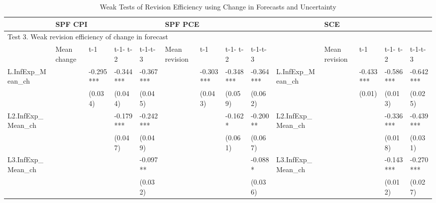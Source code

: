 \documentclass[]{article}
\begin{document}
	
	\begin{table}
		\begin{adjustbox}{width={24cm},totalheight={14cm}}
			\begin{threeparttable}
				\caption{Weak Tests of Revision Efficiency using Change in Forecasts and Uncertainty}
				\label{WeakRevEfficiency}
				\begin{tabular}{llllllllllllll}
					\hline 
					& \multicolumn{4}{l}{SPF CPI}                     & \multicolumn{4}{l}{SPF PCE}                       &                      & \multicolumn{4}{l}{SCE}                           \\
					\hline 
					\multicolumn{14}{l}{Test 3. Weak revision efficiency of change in forecast}                                                                                                                                    \\
					\hline 
					& Mean change & t-1       & t-1- t-2  & t-1-t-3   & Mean revision & t-1       & t-1- t-2  & t-1-t-3   &                      & Mean revision & t-1       & t-1- t-2  & t-1-t-3   \\
					\hline 
					L.InfExp\_Mean\_ch   &             & -0.295*** & -0.344*** & -0.367*** &               & -0.303*** & -0.348*** & -0.364*** & L.InfExp\_Mean\_ch  &         & -0.433*** & -0.586*** & -0.642*** \\
					&             & (0.034)   & (0.044)   & (0.045)   &               & (0.043)   & (0.059)   & (0.062)   &                    &         & (0.01)     & (0.013)    & (0.025)    \\
					
					L2.InfExp\_Mean\_ch  &             &           & -0.179*** & -0.242*** &               &           & -0.162*   & -0.200**  & L2.InfExp\_Mean\_ch &         &           & -0.336*** & -0.439*** \\
					
					&             &           & (0.047)   & (0.049)   &               &           & (0.061)   & (0.067)   &                                   &         &           & (0.018)    & (0.031)    \\
					L3.InfExp\_Mean\_ch  &             &           &           & -0.097**  &               &           &           & -0.088*   & L3.InfExp\_Mean\_ch &         &           & -0.143*** & -0.270*** \\
					
					&             &           &           & (0.032)   &               &           &           & (0.036)   &                                &         &           & (0.012)    & (0.027)    \\
					

\end{tabular}
\end{threeparttable}
\end{adjustbox}
\end{table}
\end{document}
